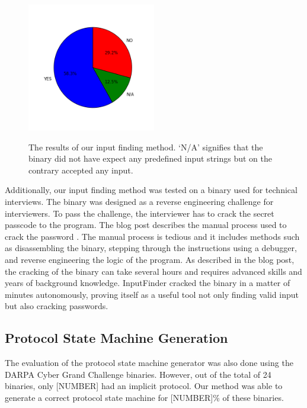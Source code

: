 \documentclass{acm_proc_article-sp}
\def \tool {InputFinder}
\def \numbinaries {24}
\begin{document}
\begin{figure}[h!]
\caption{The results of our input finding method. `N/A' signifies that the binary did not have expect any predefined input strings but on the contrary accepted any input.}
\centering
\includegraphics[width=0.5\textwidth]{findinputresults}
\label{fig:findinputresults}
\end{figure}


Additionally, our input finding method was tested on a binary used for technical interviews.
The binary was designed as a reverse engineering challenge for interviewers.
To pass the challenge, the interviewer has to crack the secret passcode to the program.
The blog post describes the manual process used to crack the password \cite{interviewbinary}.
The manual process is tedious and it includes methods such as disassembling the binary, stepping through the instructions using a debugger, and reverse engineering the logic of the program.
As described in the blog post, the cracking of the binary can take several hours and requires advanced skills and years of background knowledge.
\tool{} cracked the binary in a matter of minutes autonomously, proving itself as a useful tool not only finding valid input but also cracking passwords.

\subsection{Protocol State Machine Generation}
The evaluation of the protocol state machine generator was also done using the DARPA Cyber Grand Challenge binaries.
However, out of the total of \numbinaries{} binaries, only [NUMBER] had an implicit protocol.
Our method was able to generate a correct protocol state machine for [NUMBER]\% of these binaries.
\end{document}
